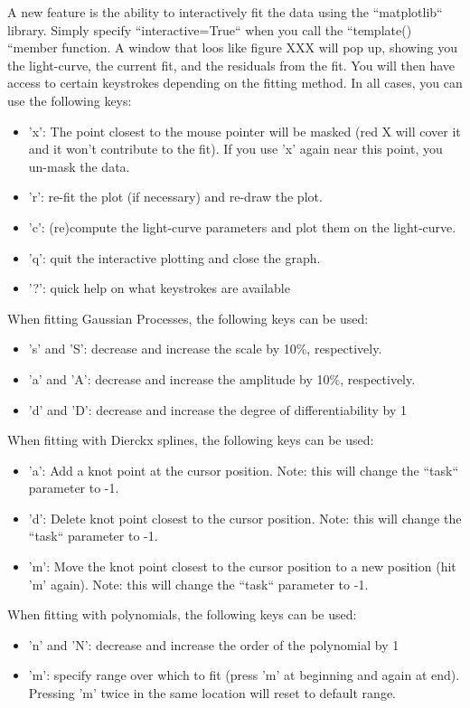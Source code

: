 A new feature is the ability to interactively fit the data using the
``matplotlib`` library. Simply specify ``interactive=True``
when you call the ``template() ``member function. A window that
loos like figure XXX will pop up, showing you the light-curve, the
current fit, and the residuals from the fit. You will then have access
to certain keystrokes depending on the fitting method. In all cases,
you can use the following keys:
\begin{itemize}
\item 'x': The point closest to the mouse pointer will be masked (red X
will cover it and it won't contribute to the fit). If you use 'x'
again near this point, you un-mask the data.
\item 'r': re-fit the plot (if necessary) and re-draw the plot.
\item 'c': (re)compute the light-curve parameters and plot them on the light-curve.
\item 'q': quit the interactive plotting and close the graph.
\item '?': quick help on what keystrokes are available
\end{itemize}
When fitting Gaussian Processes, the following keys can be used:
\begin{itemize}
\item 's' and 'S': decrease and increase the scale by 10\%, respectively.
\item 'a' and 'A': decrease and increase the amplitude by 10\%, respectively.
\item 'd' and 'D': decrease and increase the degree of differentiability
by 1
\end{itemize}
When fitting with Dierckx splines, the following keys can be used:
\begin{itemize}
\item 'a': Add a knot point at the cursor position. Note: this will change
the ``task`` parameter to -1.
\item 'd': Delete knot point closest to the cursor position. Note: this
will change the ``task`` parameter to -1.
\item 'm': Move the knot point closest to the cursor position to a new position
(hit 'm' again). Note: this will change the ``task`` parameter
to -1.
\end{itemize}
When fitting with polynomials, the following keys can be used:
\begin{itemize}
\item 'n' and 'N': decrease and increase the order of the polynomial by
1
\item 'm': specify range over which to fit (press 'm' at beginning and again
at end). Pressing 'm' twice in the same location will reset to default
range.
\end{itemize}

